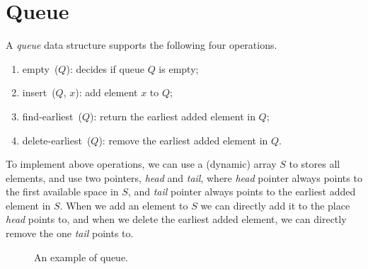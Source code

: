 \section*{Queue}

A \emph{queue} data structure supports the following four operations.
\vspace*{-\topsep}
\begin{enumerate}
\item empty~($Q$): decides if queue $Q$ is empty;
\item insert~($Q$, $x$): add element $x$ to $Q$;
\item find-earliest~($Q$): return the earliest added element in $Q$;
\item delete-earliest~($Q$): remove the earliest added element in $Q$.
\end{enumerate}

To implement above operations, we can use a (dynamic) array $S$ to stores all elements,
and use two pointers, \emph{head} and \emph{tail}, where \emph{head} pointer always points
to the first available space in $S$, and \emph{tail} pointer always points to the 
earliest added element in $S$. When we add an element to $S$ we can directly
add it to the place \emph{head} points to, and when we delete the earliest added
element, we can directly remove the one \emph{tail} points to.

\begin{figure}[h!]
\centering{}
\caption{An example of queue.}
\end{figure}

\begin{minipage}{0.8\textwidth}
	\xxx
	\xxx
	\xxx
	\xxx
\end{minipage}

\begin{minipage}{0.8\textwidth}
	\xxx
	\xxx
	\xxx
	\xxx
\end{minipage}

\begin{minipage}{0.8\textwidth}
	\xxx
	\xxx
	\xxx
\end{minipage}

\begin{minipage}{0.8\textwidth}
	\xxx
	\xxx
	\xxx
\end{minipage}

